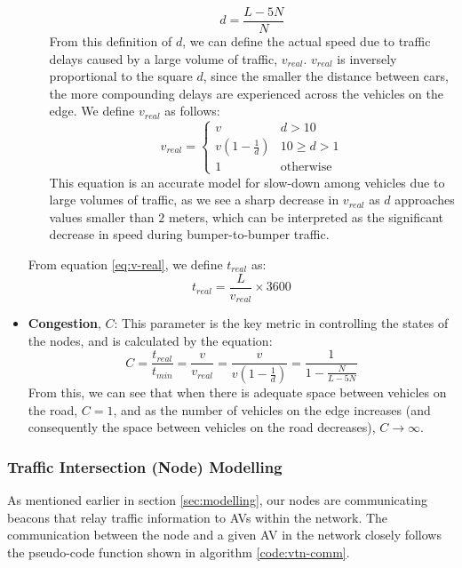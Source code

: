 \documentclass[conference]{IEEEtran}
\begin{document}
\begin{itemize}
\begin{itemize}
\begin{equation}
            d = \frac{L - 5N}{N} 
        \end{equation}
        From this definition of $d$, we can define the actual speed due to traffic delays caused by a large volume of traffic, $v_{real}$. $v_{real}$ is inversely proportional to the square $d$, since the smaller the distance between cars, the more compounding delays are experienced across the vehicles on the edge. We define $v_{real}$ as follows:
        \begin{equation}\label{eq:v-real}
            v_{real} = 
        \left\{ \begin{array}{ll}
            v & d > 10 \\
            v(1 - \frac{1}{d}) & 10 \ge d > 1 \\ 
            1 & \text{otherwise}
        \end{array} \right.
        \end{equation}
        This equation is an accurate model for slow-down among vehicles due to large volumes of traffic, as we see a sharp decrease in $v_{real}$ as $d$ approaches values smaller than $2$ meters, which can be interpreted as the significant decrease in speed during bumper-to-bumper traffic. 
    \end{itemize}
    From equation \ref{eq:v-real}, we define $t_{real}$ as:
    \begin{equation}
        t_{real} = \frac{L}{v_{real}}\times 3600
    \end{equation}
    \item \textbf{Congestion}, $C$: This parameter is the key metric in controlling the states of the nodes, and is calculated by the equation:
    \begin{equation}
        C = \frac{t_{real}}{t_{min}} = \frac{v}{v_{real}} = \frac{v}{v(1 - \frac{1}{d})} = \frac{1}{1-\frac{N}{L-5N}}
    \end{equation}
    From this, we can see that when there is adequate space between vehicles on the road, $C = 1$, and as the number of vehicles on the edge increases (and consequently the space between vehicles on the road decreases), $C \to \infty$.
    
\end{itemize}

\subsubsection{Traffic Intersection (Node) Modelling}\label{sec:node}

As mentioned earlier in section \ref{sec:modelling}, our nodes are communicating beacons that relay traffic information to AVs within the network. The communication between the node and a given AV in the network closely follows the pseudo-code function shown in algorithm \ref{code:vtn-comm}. 
\end{document}
